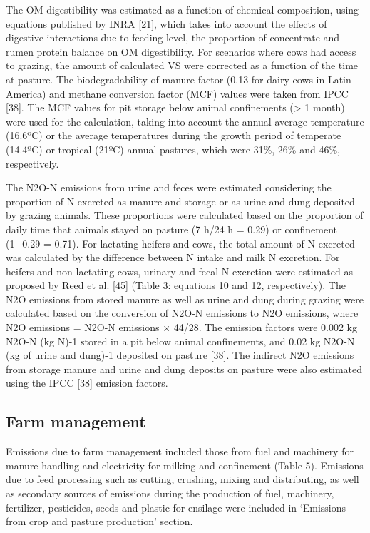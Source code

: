 \documentclass[11pt,a4paper]{article}
\begin{document}
The OM digestibility was estimated as a function of chemical composition, using equations published by INRA [21], which takes into account the effects of digestive interactions due to feeding level, the proportion of concentrate and rumen protein balance on OM digestibility. For scenarios where cows had access to grazing, the amount of calculated VS were corrected as a function of the time at pasture. The biodegradability of manure factor (0.13 for dairy cows in Latin America) and methane conversion factor (MCF) values were taken from IPCC [38]. The MCF values for pit storage below animal confinements (> 1 month) were used for the calculation, taking into account the annual average temperature (16.6ºC) or the average temperatures during the growth period of temperate (14.4ºC) or tropical (21ºC) annual pastures, which were 31\%, 26\% and 46\%, respectively.

The N2O-N emissions from urine and feces were estimated considering the proportion of N excreted as manure and storage or as urine and dung deposited by grazing animals. These proportions were calculated based on the proportion of daily time that animals stayed on pasture (7 h/24 h = 0.29) or confinement (1−0.29 = 0.71). For lactating heifers and cows, the total amount of N excreted was calculated by the difference between N intake and milk N excretion. For heifers and non-lactating cows, urinary and fecal N excretion were estimated as proposed by Reed et al. [45] (Table 3: equations 10 and 12, respectively). The N2O emissions from stored manure as well as urine and dung during grazing were calculated based on the conversion of N2O-N emissions to N2O emissions, where N2O emissions = N2O-N emissions × 44/28. The emission factors were 0.002 kg N2O-N (kg N)-1 stored in a pit below animal confinements, and 0.02 kg N2O-N (kg of urine and dung)-1 deposited on pasture [38]. The indirect N2O emissions from storage manure and urine and dung deposits on pasture were also estimated using the IPCC [38] emission factors.

\subsection{Farm management}

Emissions due to farm management included those from fuel and machinery for manure handling and electricity for milking and confinement (Table 5). Emissions due to feed processing such as cutting, crushing, mixing and distributing, as well as secondary sources of emissions during the production of fuel, machinery, fertilizer, pesticides, seeds and plastic for ensilage were included in ‘Emissions from crop and pasture production’ section.
\end{document}
